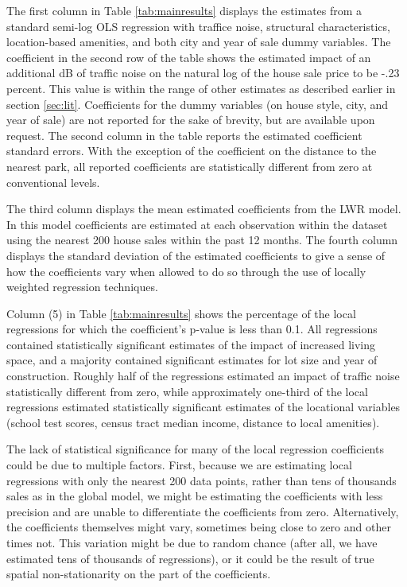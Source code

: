 \documentclass{article}\usepackage{graphicx, color}
\begin{document}
The first column in Table \ref{tab:mainresults} displays the estimates from a standard semi-log OLS regression with traffice noise, structural characteristics, location-based amenities, and both city and year of sale dummy variables. The coefficient in the second row of the table shows the estimated impact of an additional dB of traffic noise on the natural log of the house sale price to be -.23 percent. This value is within the range of other estimates as described earlier in section \ref{sec:lit}. Coefficients for the dummy variables (on house style, city, and year of sale) are not reported for the sake of brevity, but are available upon request. The second column in the table reports the estimated coefficient standard errors. With the exception of the coefficient on the distance to the nearest park, all reported coefficients are statistically different from zero at conventional levels. 

The third column displays the mean estimated coefficients from the LWR model. In this model coefficients are estimated at each observation within the dataset using the nearest 200 house sales within the past 12 months. The fourth column displays the standard deviation of the estimated coefficients to give a sense of how the coefficients vary when allowed to do so through the use of locally weighted regression techniques.

Column (5) in Table \ref{tab:mainresults} shows the percentage of the local regressions for which the coefficient's p-value is less than 0.1. All regressions contained statistically significant estimates of the impact of increased living space, and a majority contained significant estimates for lot size and year of construction. Roughly half of the regressions estimated an impact of traffic noise statistically different from zero, while approximately one-third of the local regressions estimated statistically significant estimates of the locational variables (school test scores, census tract median income, distance to local amenities).

The lack of statistical significance for many of the local regression coefficients could be due to multiple factors. First, because we are estimating local regressions with only the nearest 200 data points, rather than tens of thousands sales as in the global model, we might be estimating the coefficients with less precision and are unable to differentiate the coefficients from zero. Alternatively, the coefficients themselves might vary, sometimes being close to zero and other times not. This variation might be due to random chance (after all, we have estimated tens of thousands of regressions), or it could be the result of true spatial non-stationarity on the part of the coefficients. 
\end{document}
